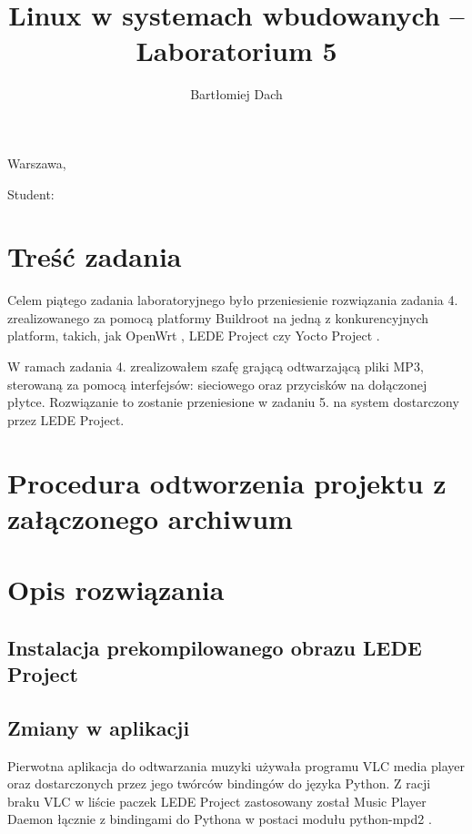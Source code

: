 \documentclass[10pt,a4paper]{article}
\title{Linux w systemach wbudowanych -- Laboratorium 5}
\author{Bartłomiej Dach}
\begin{document}
\makeatletter
\begin{flushright}
	Warszawa, \@date
\end{flushright}
\begin{center}
	\LARGE{\@title}
\end{center}
\vspace{0.25cm}
Student: \@author
\makeatother

\section{Treść zadania}

Celem piątego zadania laboratoryjnego było przeniesienie rozwiązania zadania 4. zrealizowanego
za pomocą platformy Buildroot na jedną z konkurencyjnych platform, takich, jak OpenWrt
\cite{openwrt}, LEDE Project \cite{lede} czy Yocto Project \cite{yocto}.

W ramach zadania 4. zrealizowałem szafę grającą odtwarzającą pliki MP3, sterowaną za pomocą
interfejsów: sieciowego oraz przycisków na dołączonej płytce. Rozwiązanie to zostanie przeniesione
w zadaniu 5. na system dostarczony przez LEDE Project.

\section{Procedura odtworzenia projektu z załączonego archiwum}


\section{Opis rozwiązania}

\subsection{Instalacja prekompilowanego obrazu LEDE Project}


\subsection{Zmiany w aplikacji}

Pierwotna aplikacja do odtwarzania muzyki używała programu VLC media player oraz dostarczonych
przez jego twórców bindingów do języka Python. Z racji braku VLC w liście paczek LEDE Project
zastosowany został Music Player Daemon \cite{mpd} łącznie z bindingami do Pythona w postaci
modułu python-mpd2 \cite{python-mpd2}.
\end{document}
